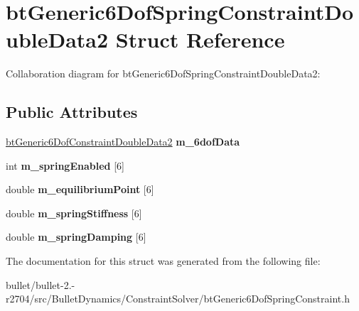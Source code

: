 \hypertarget{structbt_generic6_dof_spring_constraint_double_data2}{\section{bt\+Generic6\+Dof\+Spring\+Constraint\+Double\+Data2 Struct Reference}
\label{structbt_generic6_dof_spring_constraint_double_data2}
}


Collaboration diagram for bt\+Generic6\+Dof\+Spring\+Constraint\+Double\+Data2\+:
\subsection*{Public Attributes}
\begin{DoxyCompactItemize}
\item 
\hypertarget{structbt_generic6_dof_spring_constraint_double_data2_ace84f798837107c558c2055a3c54be55}{\hyperlink{structbt_generic6_dof_constraint_double_data2}{bt\+Generic6\+Dof\+Constraint\+Double\+Data2} {\bfseries m\+\_\+6dof\+Data}}\label{structbt_generic6_dof_spring_constraint_double_data2_ace84f798837107c558c2055a3c54be55}

\item 
\hypertarget{structbt_generic6_dof_spring_constraint_double_data2_a1876aef7e083110918863affa4d954f4}{int {\bfseries m\+\_\+spring\+Enabled} \mbox{[}6\mbox{]}}\label{structbt_generic6_dof_spring_constraint_double_data2_a1876aef7e083110918863affa4d954f4}

\item 
\hypertarget{structbt_generic6_dof_spring_constraint_double_data2_a0e1f3d4b938bf34d42e6f56797958498}{double {\bfseries m\+\_\+equilibrium\+Point} \mbox{[}6\mbox{]}}\label{structbt_generic6_dof_spring_constraint_double_data2_a0e1f3d4b938bf34d42e6f56797958498}

\item 
\hypertarget{structbt_generic6_dof_spring_constraint_double_data2_a957a7fda176a4efde6404f74adcb74d2}{double {\bfseries m\+\_\+spring\+Stiffness} \mbox{[}6\mbox{]}}\label{structbt_generic6_dof_spring_constraint_double_data2_a957a7fda176a4efde6404f74adcb74d2}

\item 
\hypertarget{structbt_generic6_dof_spring_constraint_double_data2_a6cef5f6bcd61c90cd60b5ecd689d8e93}{double {\bfseries m\+\_\+spring\+Damping} \mbox{[}6\mbox{]}}\label{structbt_generic6_dof_spring_constraint_double_data2_a6cef5f6bcd61c90cd60b5ecd689d8e93}

\end{DoxyCompactItemize}


The documentation for this struct was generated from the following file\+:\begin{DoxyCompactItemize}
\item 
bullet/bullet-\/2.-\/r2704/src/\+Bullet\+Dynamics/\+Constraint\+Solver/bt\+Generic6\+Dof\+Spring\+Constraint.\+h\end{DoxyCompactItemize}
